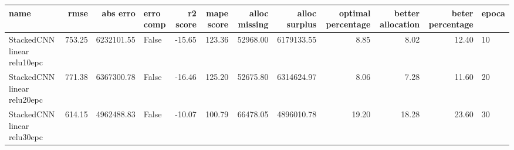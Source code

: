 \begin{tabular}{lrrlrrrrrrrl}
\toprule
name & rmse & abs erro & erro comp & r2 score & mape score & alloc missing & alloc surplus & optimal percentage & better allocation & beter percentage & epoca \\
\midrule
StackedCNN linear relu10epc & 753.25 & 6232101.55 & False & -15.65 & 123.36 & 52968.00 & 6179133.55 & 8.85 & 8.02 & 12.40 & 10 \\
StackedCNN linear relu20epc & 771.38 & 6367300.78 & False & -16.46 & 125.20 & 52675.80 & 6314624.97 & 8.06 & 7.28 & 11.60 & 20 \\
StackedCNN linear relu30epc & 614.15 & 4962488.83 & False & -10.07 & 100.79 & 66478.05 & 4896010.78 & 19.20 & 18.28 & 23.60 & 30 \\
\bottomrule
\end{tabular}
